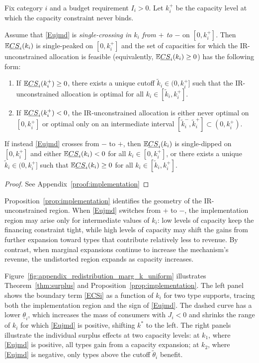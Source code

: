 \documentclass{class}
\begin{document}
\begin{proposition}\label{prop:implementation}
Fix category \(i\) and a budget requirement \(I_i>0\). Let \(k_i^+\) be the capacity level at which the capacity constraint never binds.

Assume that \ref{Eujmd} is \emph{single-crossing in \(k_i\) from \(+\) to \(-\)} on \([0,k_i^+]\). Then \(\mathbb{E}\underline{CS}_i(k_i)\) is single-peaked on \([0,k_i^+]\) and the set of capacities for which the IR-unconstrained allocation is feasible (equivalently, \(\mathbb{E}\underline{CS}_i(k_i)\ge 0\)) has the following form:
\begin{enumerate}[label=(\roman*), leftmargin=1cm]
\item If \(\mathbb{E}\underline{CS}_i(k_i^+)\ge 0\), there exists a unique cutoff \(\tilde k_i\in(0,k_i^+]\) such that the IR-unconstrained allocation is optimal for all \(k_i\in[\tilde k_i,k_i^+]\).
\item If \(\mathbb{E}\underline{CS}_i(k_i^+)<0\), the IR-unconstrained allocation is either never optimal on \([0,k_i^+]\) or optimal only on an intermediate interval \([\tilde k_i^-,\tilde k_i^+]\subset(0,k_i^+)\).
\end{enumerate}

If instead \ref{Eujmd} crosses from \(-\) to \(+\), then \(\mathbb{E}\underline{CS}_i(k_i)\) is single-dipped on \([0,k_i^+]\) and either \(\mathbb{E}\underline{CS}_i(k_i)<0\) for all \(k_i\in[0,k_i^+]\), or there exists a unique \(\tilde k_i\in(0,k_i^+]\) such that \(\mathbb{E}\underline{CS}_i(k_i)\ge 0\) for all \(k_i\in[\tilde k_i,k_i^+]\).
\end{proposition}
\begin{proof}
    See Appendix~\ref{proof:implementation}
\end{proof}
Proposition~\ref{prop:implementation} identifies the geometry of the IR-unconstrained region. When \ref{Eujmd} switches from \(+\) to \(-\), the implementation region may arise only for intermediate values of \(k_i\): low levels of capacity keep the financing constraint tight, while high levels of capacity may shift the gains from further expansion toward types that contribute relatively less to revenue. By contrast, when marginal expansions continue to increase the mechanism's revenue, the undistorted region expands as capacity increases.


Figure~\ref{fig:appendix_redistribution_marg_k_uniform} illustrates Theorem~\ref{thm:surplus} and Proposition~\ref{prop:implementation}. The left panel shows the boundary term \ref{ECSi} as a function of $k_i$ for two type supports, tracing both the implementation region and the sign of \ref{Eujmd}. The dashed curve has a lower $\underline{\theta}_i$, which increases the mass of consumers with $J_i<0$ and shrinks the range of $k_i$ for which \ref{Eujmd} is positive, shifting $k^\ast$ to the left. The right panels illustrate the individual surplus effects at two capacity levels: at $k_1$, where \ref{Eujmd} is positive, all types gain from a capacity expansion; at $k_2$, where \ref{Eujmd} is negative, only types above the cutoff $\tilde\theta_i$ benefit.
\end{document}
